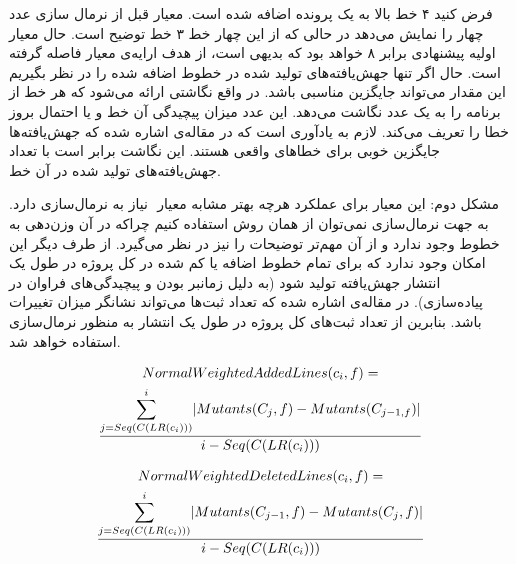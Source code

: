 فرض کنید ۴ خط بالا به یک پرونده اضافه شده است. معیار   قبل از نرمال سازی عدد چهار را نمایش می‌دهد در حالی که از این چهار خط ۳ خط توضیح است. حال معیار اولیه پیشنهادی برابر ۸ خواهد بود که بدیهی است، از هدف ارايه‌ی معیار فاصله گرفته است. حال اگر تنها جهش‌یافته‌های تولید شده در خطوط اضافه شده را در نظر بگیریم این مقدار می‌تواند جایگزین مناسبی باشد. در‌ واقع نگاشتی  ارائه می‌شود که هر خط از برنامه را به یک عدد نگاشت می‌دهد. این عدد میزان پیچیدگی آن خط و یا احتمال بروز خطا را تعریف می‌کند.  لازم به یادآوری است که در مقاله‌ی  \cite{just2014mutants} اشاره شده که جهش‌یافته‌ها جایگزین خوبی برای خطاهای واقعی هستند. این نگاشت برابر است با تعداد جهش‌یافته‌های تولید شده در آن خط.

مشکل دوم: این معیار برای عملکرد هرچه بهتر مشابه معیار  ‌ نیاز به نرمال‌سازی دارد. به جهت نرمال‌سازی نمی‌توان از همان روش استفاده کنیم چراکه در آن وزن‌دهی به خطوط وجود ندارد و از آن مهم‌تر توضیحات را نیز در نظر می‌گیرد. از طرف دیگر این امکان وجود ندارد که برای تمام خطوط اضافه یا کم شده در کل پروژه در طول یک انتشار جهش‌یافته تولید شود (به دلیل زمانبر بودن و پیچیدگی‌های فراوان در پیاده‌سازی). در مقاله‌ی \cite{bird2011don} اشاره شده که تعداد ثبت‌ها می‌تواند نشانگر میزان تغییرات باشد. بنابرین از تعداد ثبت‌های کل پروژه در طول یک انتشار به منظور نرمال‌سازی استفاده خواهد شد.\\

\begin{latin}
\begin{multline*}
NormalWeightedAddedLines(c_i,f) =\\ \frac{ \mathlarger{\sum}\limits_{j=Seq(C(LR(c_i)))}^{i} |Mutants(C_j,f) - Mutants(C_{j-1,f})|
	}{i - Seq(C(LR(c_i)))}\\
\end{multline*}
\end{latin}

\begin{latin}
	\begin{multline*}
	NormalWeightedDeletedLines(c_i,f) =\\ \frac{ \mathlarger{\sum}\limits_{j=Seq(C(LR(c_i)))}^{i} |Mutants(C_{j-1},f) - Mutants(C_j,f)|
	}{i - Seq(C(LR(c_i)))}\\
	\end{multline*}
\end{latin}

